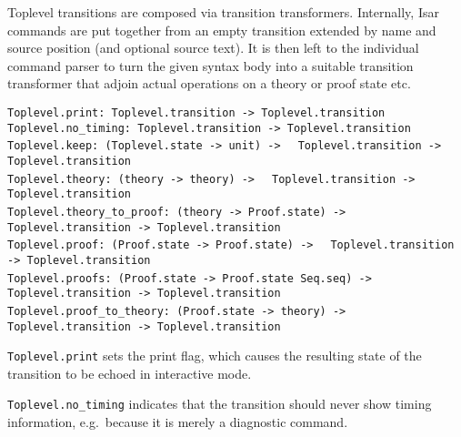 \begin{isabellebody}
\begin{isamarkuptext}
  Toplevel transitions are composed via transition transformers.
  Internally, Isar commands are put together from an empty transition
  extended by name and source position (and optional source text).  It
  is then left to the individual command parser to turn the given
  syntax body into a suitable transition transformer that adjoin
  actual operations on a theory or proof state etc.%
\end{isamarkuptext}%
\isamarkuptrue%
%
\isadelimmlref
%
\endisadelimmlref
%
\isatagmlref
%
\begin{isamarkuptext}%
\begin{mldecls}
  \verb|Toplevel.print: Toplevel.transition -> Toplevel.transition| \\
  \verb|Toplevel.no_timing: Toplevel.transition -> Toplevel.transition| \\
  \verb|Toplevel.keep: (Toplevel.state -> unit) ->|\isasep\isanewline%
\verb|  Toplevel.transition -> Toplevel.transition| \\
  \verb|Toplevel.theory: (theory -> theory) ->|\isasep\isanewline%
\verb|  Toplevel.transition -> Toplevel.transition| \\
  \verb|Toplevel.theory_to_proof: (theory -> Proof.state) ->|\isasep\isanewline%
\verb|  Toplevel.transition -> Toplevel.transition| \\
  \verb|Toplevel.proof: (Proof.state -> Proof.state) ->|\isasep\isanewline%
\verb|  Toplevel.transition -> Toplevel.transition| \\
  \verb|Toplevel.proofs: (Proof.state -> Proof.state Seq.seq) ->|\isasep\isanewline%
\verb|  Toplevel.transition -> Toplevel.transition| \\
  \verb|Toplevel.proof_to_theory: (Proof.state -> theory) ->|\isasep\isanewline%
\verb|  Toplevel.transition -> Toplevel.transition| \\
  \end{mldecls}

  \begin{description}

  \item \verb|Toplevel.print| sets the print flag, which causes the
  resulting state of the transition to be echoed in interactive mode.

  \item \verb|Toplevel.no_timing| indicates that the transition should
  never show timing information, e.g.\ because it is merely a
  diagnostic command.


\end{description}
\end{isamarkuptext}
\end{isabellebody}
